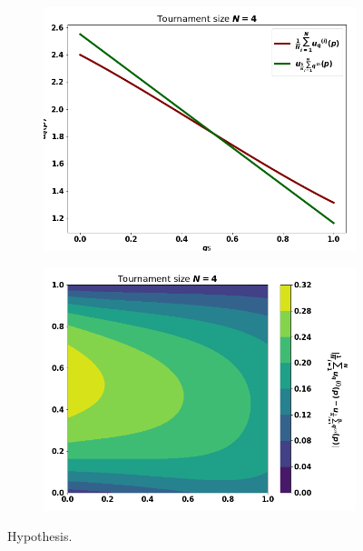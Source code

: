 \documentclass[10pt]{article}
\begin{document}
\begin{figure}[!htbp]
    \begin{center}
        \begin{subfigure}{0.45\textwidth}
            \includegraphics[width=\linewidth]{img/mean_vs_average.png}
        \end{subfigure}
        \begin{subfigure}{0.45\textwidth}
            \includegraphics[width=\linewidth]{img/mean_vs_average_two.png}
        \end{subfigure}
    \end{center}
    \caption{Hypothesis.}
    \label{fig:hypothesis}
\end{figure}
\end{document}
